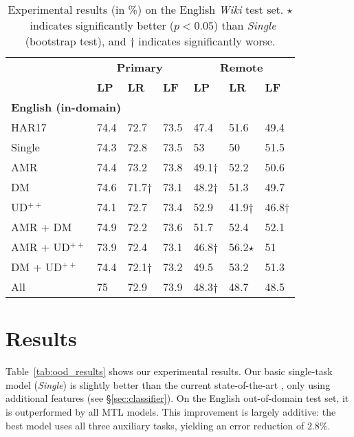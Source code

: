 \documentclass[11pt,a4paper]{article}
\begin{document}
\begin{table}[t]
\centering
\small
\setlength\tabcolsep{3pt}
\begin{tabular}{l|lll|lll}
& \multicolumn{3}{c|}{\footnotesize \bf Primary} & \multicolumn{3}{c}{\footnotesize \bf Remote} \\
& \footnotesize \textbf{LP} & \footnotesize \textbf{LR} & \footnotesize \textbf{LF}
& \footnotesize \textbf{LP} & \footnotesize \textbf{LR} & \footnotesize \textbf{LF} \\
\hline
\multicolumn{4}{l|}{\small \bf English (in-domain)} & \\
\footnotesize HAR17
& 74.4 & 72.7 & 73.5 & 47.4 & 51.6 & 49.4 \\
\footnotesize Single
& 74.3 & 72.8 & 73.5 & 53 & 50 & 51.5 \\
\cline{1-1}
\footnotesize AMR
& 74.4 & 73.2 & 73.8 & 49.1$\dagger$ & 52.2 & 50.6 \\
\footnotesize DM
& 74.6 & 71.7$\dagger$ & 73.1 & 48.2$\dagger$ & 51.3 & 49.7 \\
\footnotesize UD$^{++}$
& 74.1 & 72.7 & 73.4 & 52.9 & 41.9$\dagger$ & 46.8$\dagger$ \\
\footnotesize AMR + DM
& 74.9 & 72.2 & 73.6 & 51.7 & 52.4 & 52.1 \\
\footnotesize AMR + UD$^{++}$
& 73.9 & 72.4 & 73.1 & 46.8$\dagger$ & 56.2$\star$ & 51 \\
\footnotesize DM + UD$^{++}$
& 74.4 & 72.1$\dagger$ & 73.2 & 49.5 & 53.2 & 51.3 \\
\footnotesize All
& 75 & 72.9 & 73.9 & 48.3$\dagger$ & 48.7 & 48.5
\end{tabular}
\caption{
Experimental results (in \%) on the English \textit{Wiki} test set.
$\star$~indicates significantly better ($p<0.05$) than \textit{Single} (bootstrap test),
and $\dagger$ indicates significantly worse.
}
\label{tab:id_results}
\end{table}

\section{Results}\label{sec:results}

Table~\ref{tab:ood_results} shows our experimental results.
Our basic single-task model (\textit{Single})
is slightly better than the current state-of-the-art
\citet[shown as \textit{HAR17}]{hershcovich2017a},
only using additional features (see \S\ref{sec:classifier}).
On the English out-of-domain test set,
it is outperformed by all MTL models.
This improvement is largely additive: the best model uses all three auxiliary tasks,
yielding an error reduction of 2.8\%.
\end{document}
